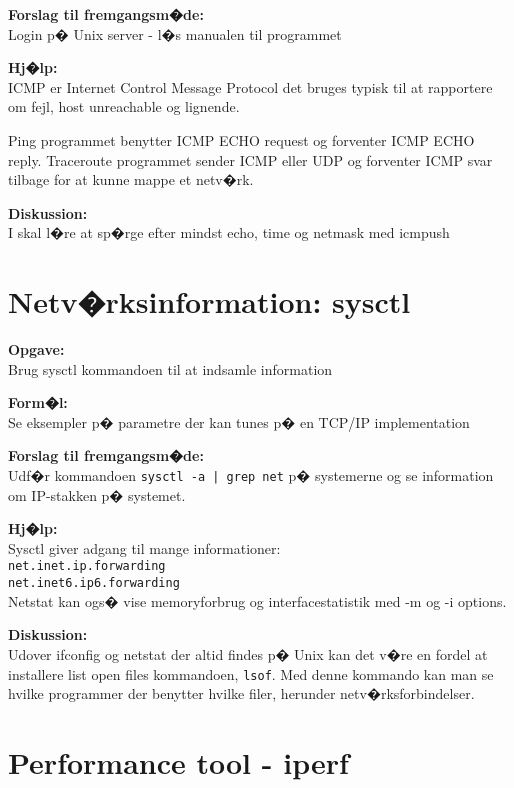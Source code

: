 \documentclass[a4paper,11pt,notitlepage]{oevelser}
\begin{document}
{\bfseries Forslag til fremgangsm�de:} \\
Login p� Unix server - l�s manualen til programmet

{\bfseries Hj�lp:} \\
ICMP er Internet Control Message Protocol det bruges typisk til at
rapportere om fejl, host unreachable og lignende.

Ping programmet benytter ICMP ECHO request og forventer ICMP ECHO
reply. Traceroute programmet sender ICMP eller UDP og forventer ICMP
svar tilbage for at kunne mappe et netv�rk.

{\bfseries Diskussion:}\\
I skal l�re at sp�rge efter mindst echo, time og netmask med icmpush




\chapter{Netv�rksinformation: sysctl}
\label{ex:sysctl}

{\bfseries Opgave:}\\
Brug sysctl kommandoen til at indsamle information

{\bfseries Form�l:}\\
Se eksempler p� parametre der kan tunes p� en TCP/IP implementation

{\bfseries Forslag til fremgangsm�de:}\\
Udf�r kommandoen \verb+sysctl -a | grep net+ p� systemerne og
se information om IP-stakken p� systemet.

{\bfseries Hj�lp:}\\

Sysctl giver adgang til mange informationer:\\
\verb+net.inet.ip.forwarding+\\
\verb+net.inet6.ip6.forwarding+\\

Netstat kan ogs� vise memoryforbrug og interfacestatistik med -m og -i
options.

{\bfseries Diskussion:}\\
Udover ifconfig og netstat der altid findes p� Unix kan det v�re en
fordel at installere list open files kommandoen, \verb+lsof+. Med
denne kommando kan man se hvilke programmer der benytter hvilke filer,
herunder netv�rksforbindelser.



\chapter{Performance tool - iperf}
\label{ex:iperf}
\end{document}
